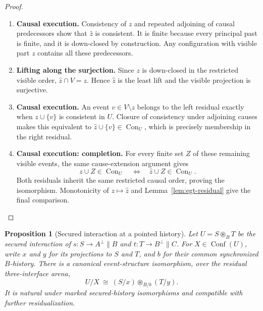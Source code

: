 \documentclass[11pt,a4paper]{article}
\numberwithin{equation}{section}
\newtheorem{proposition}[theorem]{Proposition}
\theoremstyle{definition}
\theoremstyle{remark}
\theoremstyle{plain}
\begin{document}
\begin{proof}
\leavevmode
\begin{enumerate}[label=\textup{(\arabic*)},leftmargin=*,itemsep=4pt,topsep=3pt]
  \item \textbf{Causal execution.} Consistency of $z$ and repeated adjoining of causal predecessors show
that $\widehat z$ is consistent. It is finite because every principal
past is finite, and it is down-closed by construction. Any configuration
with visible part $z$ contains all these predecessors.
  \item \textbf{Lifting along the surjection.} Since $z$ is
down-closed in the restricted visible order, $\widehat z\cap V=z$. Hence $\widehat z$ is the least lift and the visible projection is
surjective.
  \item \textbf{Causal execution.} An event $v\in V\setminus z$ belongs to the left residual exactly when
$z\cup\{v\}$ is consistent in $U$. Closure of consistency under
adjoining causes makes this equivalent to
$\widehat z\cup\{v\}\in\operatorname{Con}_U$, which is precisely
membership in the right residual.
  \item \textbf{Causal execution: completion.} For every finite set $Z$ of these
remaining visible events, the same cause-extension argument gives
\[
 z\cup Z\in\operatorname{Con}_U
 \quad\Longleftrightarrow\quad
 \widehat z\cup Z\in\operatorname{Con}_U.
\]
Both residuals inherit the same restricted causal order, proving the
isomorphism. Monotonicity of $z\mapsto\widehat z$ and
Lemma~\ref{lem:egt-residual} give the final comparison.
\end{enumerate}
\end{proof}


\begin{proposition}[Secured interaction at a pointed history]
\label{prop:egt-pointed-secured-interaction}
Let $U=S\mathbin{\circledast_B}T$ be the secured interaction of
$s:S\to A^\perp\parallel B$ and $t:T\to B^\perp\parallel C$.
For $X\in\operatorname{Conf}(U)$, write $x$ and $y$ for its projections
to $S$ and $T$, and $b$ for their common synchronized $B$-history.
There is a canonical event-structure isomorphism, over the residual
three-interface arena,
\begin{equation}\label{eq:egt-secured-pointed-interaction}
 U/X\ \cong\ (S/x)\mathbin{\circledast_{B/b}}(T/y).
\end{equation}
It is natural under marked secured-history isomorphisms and compatible
with further residualization.
\end{proposition}
\end{document}
